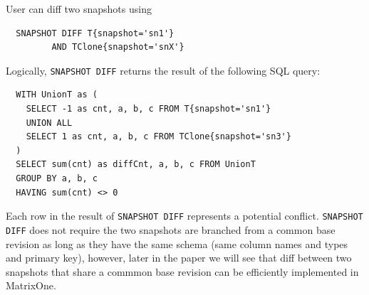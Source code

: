 \documentclass[sigconf,nonacm]{acmart} %
\begin{document}
User can diff two snapshots using 
\begin{verbatim}
  SNAPSHOT DIFF T{snapshot='sn1'} 
         AND TClone{snapshot='snX'}
\end{verbatim}  
Logically, \texttt{SNAPSHOT DIFF} returns the result of the following SQL query:
\begin{verbatim}
  WITH UnionT as (
    SELECT -1 as cnt, a, b, c FROM T{snapshot='sn1'}
    UNION ALL
    SELECT 1 as cnt, a, b, c FROM TClone{snapshot='sn3'}
  )
  SELECT sum(cnt) as diffCnt, a, b, c FROM UnionT 
  GROUP BY a, b, c
  HAVING sum(cnt) <> 0
\end{verbatim}
Each row in the result of \texttt{SNAPSHOT DIFF} represents a potential conflict.
\texttt{SNAPSHOT DIFF} does not require the two snapshots are branched from a 
common base revision as long as they have the same schema (same column names and types and primary key), 
however, later in the paper we will see that diff between 
two snapshots that share a commmon base revision can be efficiently 
implemented in MatrixOne.  
\end{document}
